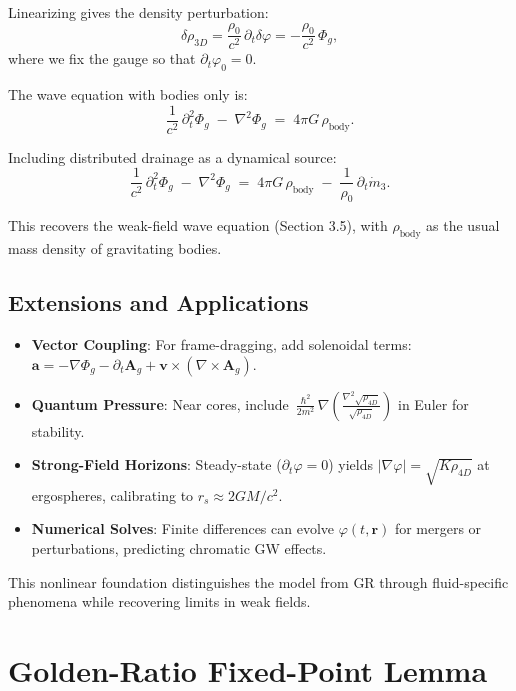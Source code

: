Linearizing gives the density perturbation:
\[
\delta \rho_{3D} = \frac{\rho_0}{c^2} \, \partial_t \delta \varphi = -\frac{\rho_0}{c^2} \, \Phi_g,
\]
where we fix the gauge so that $\partial_t \varphi_0 = 0$.

The wave equation with bodies only is:
\begin{equation}
\frac{1}{c^{2}}\,\partial_{t}^{2}\Phi_g \;-\; \nabla^{2}\Phi_g
\;=\; 4\pi G\,\rho_{\text{body}}.
\end{equation}

Including distributed drainage as a dynamical source:
\begin{equation}
\frac{1}{c^{2}}\,\partial_{t}^{2}\Phi_g \;-\; \nabla^{2}\Phi_g
\;=\; 4\pi G\,\rho_{\text{body}} \;-\; \frac{1}{\rho_{0}}\,\partial_{t}\dot m_{3}.
\end{equation}

This recovers the weak-field wave equation (Section 3.5), with $\rho_{\text{body}}$ as the usual mass density of gravitating bodies.

\subsection{Extensions and Applications}

\begin{itemize}
\item \textbf{Vector Coupling}: For frame-dragging, add solenoidal terms:
$\mathbf{a} = -\nabla \Phi_g - \partial_t \mathbf{A}_g + \mathbf{v} \times (\nabla \times \mathbf{A}_g)$.
\item \textbf{Quantum Pressure}: Near cores, include $\,\frac{\hbar^2}{2m^{2}}\, \nabla\!\left(\frac{\nabla^2 \sqrt{\rho_{4D}}}{\sqrt{\rho_{4D}}}\right)$ in Euler for stability.
\item \textbf{Strong-Field Horizons}: Steady-state ($\partial_t \varphi = 0$) yields $|\nabla \varphi| = \sqrt{K \rho_{4D}}$ at ergospheres, calibrating to $r_s \approx 2GM/c^2$.
\item \textbf{Numerical Solves}: Finite differences can evolve $\varphi(t,\mathbf{r})$ for mergers or perturbations, predicting chromatic GW effects.
\end{itemize}

This nonlinear foundation distinguishes the model from GR through fluid-specific phenomena while recovering limits in weak fields.


\section{Golden-Ratio Fixed-Point Lemma}\label{app:phi-fixed-point}

